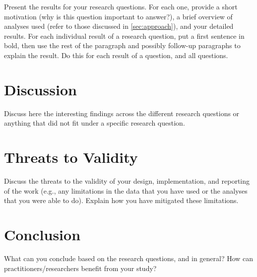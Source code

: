 \documentclass[10pt, conference]{IEEEtran}
\begin{document}
Present the results for your research questions. For each one, provide a short motivation (why is this question important to answer?), a brief overview of analyses used (refer to those discussed in \autoref{sec:approach}), and your detailed results. For each individual result of a research question, put a first sentence in bold, then use the rest of the paragraph and possibly follow-up paragraphs to explain the result. Do this for each result of a question, and all questions.


\section{Discussion}
\label{sec:disc}

Discuss here the interesting findings across the different research questions or anything that did not fit under a specific research question. 

\section{Threats to Validity}
\label{sec:thre-valid}

Discuss the threats to the validity of your design, implementation, and reporting of the work (e.g., any limitations in the data that you have used or the analyses that you were able to do). Explain how you have mitigated these limitations.


\section{Conclusion}
\label{sec:conclusion}

What can you conclude based on the research questions, and in general? How can practitioners/researchers benefit from your study?


\balance


\end{document}
